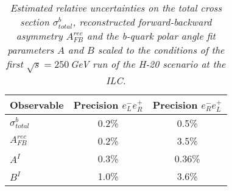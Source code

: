         \begin{table}
        \begin{center}
        \begin{tabular}{l c c}
        \hline
	Observable & Precision $e^-_Le^+_R$ & Precision $e^-_Re^+_L$\\
	\hline
	$\sigma^b_{total} $  & 0.2\%   & 0.5\% \\
	$A_{FB}^{rec} $& 0.2\%  & 3.5\% \\
	$A^I $ 			& 0.3\% & 0.36\% \\
	$B^I $ 			& 1.0\% & 3.6\% \\
		
        \hline
        \end{tabular}
        \end{center}
        \caption{\sl Estimated relative uncertainties on the total cross section $\sigma^b_{total}$, reconstructed forward-backward asymmetry $A_{FB}^{rec}$ and the b-quark polar angle fit parameters $A$ and $B$ scaled to the conditions of the first $\sqrt{s}=250$\,GeV run of the H-20 scenario at the ILC. }
        \label{table:bbbarfinal}
        \end{table}
